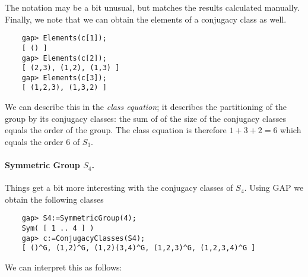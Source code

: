 The notation may be a bit unusual, but matches the results calculated manually. Finally, we note that we can obtain the elements of a conjugacy class as well.

\begin{verbatim}
    gap> Elements(c[1]);
    [ () ]
    gap> Elements(c[2]);
    [ (2,3), (1,2), (1,3) ]
    gap> Elements(c[3]);
    [ (1,2,3), (1,3,2) ]
\end{verbatim}

We can describe this in the \emph{class equation}; it describes the partitioning of the group by its conjugacy classes: the sum of of the size of the conjugacy classes equals the order of the group. The class equation is therefore $1 + 3 + 2 = 6$ which equals the order $6$ of $S_3$.

\paragraph{Symmetric Group $S_4$.} Things get a bit more interesting with the conjugacy classes of $S_4$. Using GAP we obtain the following classes

\begin{verbatim}
    gap> S4:=SymmetricGroup(4);
    Sym( [ 1 .. 4 ] )
    gap> c:=ConjugacyClasses(S4);
    [ ()^G, (1,2)^G, (1,2)(3,4)^G, (1,2,3)^G, (1,2,3,4)^G ]
\end{verbatim}

We can interpret this as follows:

